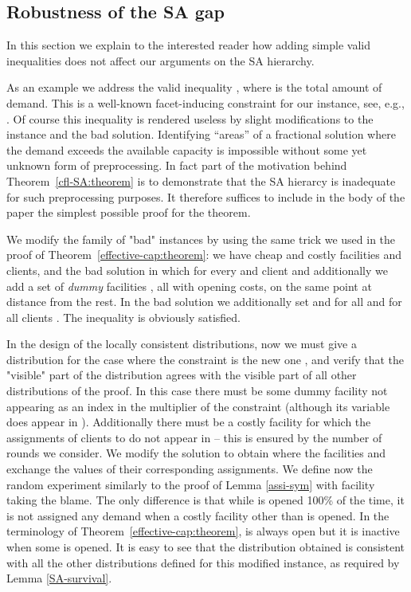 \documentclass[11pt]{article}
\begin{document}
\subsection{Robustness of the SA gap} \label{sec:robust} 

In  this section  we explain to the  interested reader  how
adding simple valid inequalities does  not affect our arguments on the
SA hierarchy. 

As an example we address the valid inequality 
, where   is the
total  amount  of  demand.  This  is  a  well-known
facet-inducing constraint for our instance, see, e.g., \cite[p. 283]{LeungM89}. 
Of course this inequality is  rendered useless by  slight modifications to
the instance and the bad solution. 
Identifying  ``areas'' of a fractional  solution  where  the demand  exceeds the
available capacity is impossible  without some yet unknown form of preprocessing.
In fact part of the motivation behind   Theorem~\ref{cfl-SA:theorem}
is to demonstrate that the 
SA hierarcy is inadequate for such preprocessing purposes. It therefore 
suffices  to include in the body of the paper 
the simplest possible proof for the theorem. 



We modify  the family of  "bad" instances by  using the same  trick we
used in the proof  of Theorem~\ref{effective-cap:theorem}: we have 
cheap  and   costly  facilities  and   clients,  and the  bad
solution  in which  for every    and
client              and additionally we add a set of  
{\em dummy} facilities
,   all with   opening costs, on  the same
point  at distance   from  the  rest. In  the bad  solution   we
additionally set  and   for all  and for
all clients . The inequality is obviously satisfied.

In the  design of  the locally consistent  distributions, now  we must
give a distribution for the case where the constraint  is the new
one , and verify that the "visible"
part of  the distribution  agrees with the  visible part of  all other
distributions of  the proof.   In this case  there must be  some dummy
facility  not appearing as an  index in the multiplier  of the
constraint    (although   its       variable    does    appear   in
). Additionally  there must be  a costly facility   for which
the assignments  of clients to   do not  appear in  --
this is  ensured by the number  of rounds we consider.   We modify the
solution   to obtain  where the facilities   and
  exchange the  values  of their  corresponding assignments.   We
define  now the  random experiment  similarly  to the  proof of  Lemma
\ref{assi-sym}  with  facility     taking  the  blame.  The  only
difference is that while  is  opened 100\% of the time, it is not
assigned any demand when a  costly facility other than  is opened.
In  the terminology  of  Theorem~\ref{effective-cap:theorem},   is
always open but  it is inactive when some  
is  opened.  It  is  easy to  see  that the  distribution obtained  is
consistent with all the  other distributions defined for this modified
instance, as required by Lemma \ref{SA-survival}.
\end{document}
